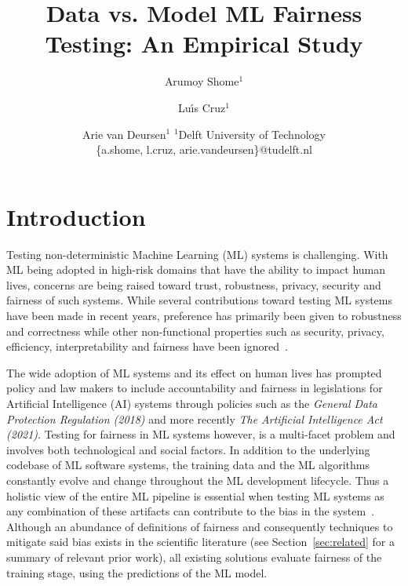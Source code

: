 \documentclass{article}
\title{Data vs. Model ML Fairness Testing: An Empirical Study}
\author{
  Arumoy Shome$^1$
  \and
  Lu{\'\i}s Cruz$^1$\and
  Arie van Deursen$^{1}$
  \affiliations
  $^1$Delft University of Technology\\
  \emails
  \{a.shome, l.cruz, arie.vandeursen\}@tudelft.nl
}
\begin{document}
\maketitle

\begin{abstract}
\end{abstract}

\section{Introduction}\label{sec:intro}


Testing non-deterministic Machine Learning (ML) systems is
challenging. With ML being adopted in high-risk domains that have the
ability to impact human lives, concerns are being raised toward trust,
robustness, privacy, security and fairness of such systems. While
several contributions toward testing ML systems have been made in
recent years, preference has primarily been given to robustness and
correctness while other non-functional properties such as security,
privacy, efficiency, interpretability and fairness have been
ignored \cite{zhang2020machine,zhang2021ignorance,mehrabi2021survey,wan2021modeling}.

The wide adoption of ML systems and its effect on human lives has
prompted policy and law makers to include accountability and fairness
in legislations for Artificial Intelligence (AI) systems through
policies such as the \emph{General Data Protection Regulation (2018)}
and more recently \emph{The Artificial Intelligence Act (2021)}.
Testing for fairness in ML systems however, is a multi-facet problem
and involves both technological and social factors. In addition to the
underlying codebase of ML software systems, the training data and the
ML algorithms constantly evolve and change throughout the ML
development lifecycle. Thus a holistic view of the entire ML pipeline
is essential when testing ML systems as any combination of these
artifacts can contribute to the bias in the
system \cite{sculley2015hidden,bosch2021engineering,hutchinson2021towards,sato2019continuous}.
Although an abundance of definitions of fairness and consequently
techniques to mitigate said bias exists in the scientific literature
(see Section \ref{sec:related} for a summary of relevant prior work),
all existing solutions evaluate fairness of the training stage, using
the predictions of the ML model.
\end{document}
